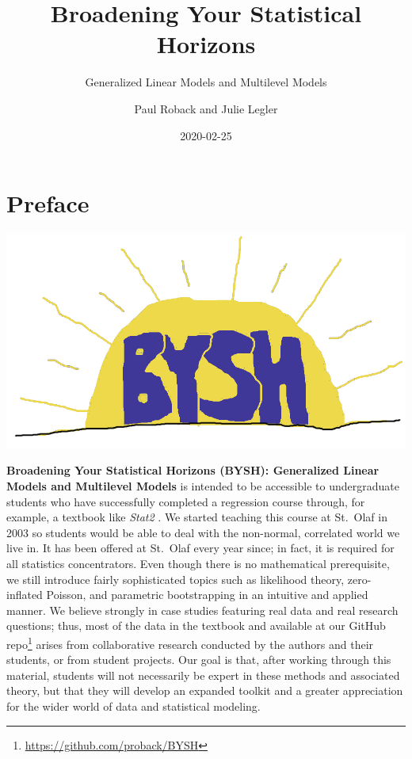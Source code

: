 \documentclass[
]{krantz}
\title{Broadening Your Statistical Horizons}
\subtitle{Generalized Linear Models and Multilevel Models}
\author{Paul Roback and Julie Legler}
\date{2020-02-25}
\renewcommand{\href}[2]{#2\footnote{\url{#1}}}
\begin{document}
\maketitle


\thispagestyle{empty}

\setlength{\abovedisplayskip}{-5pt}
\setlength{\abovedisplayshortskip}{-5pt}

{
\hypersetup{linkcolor=}
\setcounter{tocdepth}{2}
\tableofcontents
}
\mainmatter

\hypertarget{preface}{%
\chapter*{Preface}\label{preface}}


\includegraphics[width=0.75\linewidth]{data/cover}

\textbf{Broadening Your Statistical Horizons (BYSH): Generalized Linear Models and Multilevel Models} is intended to be accessible to undergraduate students who have successfully completed a regression course through, for example, a textbook like \emph{Stat2} \citep{Cannon2019}. We started teaching this course at St.~Olaf in 2003 so students would be able to deal with the non-normal, correlated world we live in. It has been offered at St.~Olaf every year since; in fact, it is required for all statistics concentrators. Even though there is no mathematical prerequisite, we still introduce fairly sophisticated topics such as likelihood theory, zero-inflated Poisson, and parametric bootstrapping in an intuitive and applied manner. We believe strongly in case studies featuring real data and real research questions; thus, most of the data in the textbook and \href{https://github.com/proback/BYSH}{available at our GitHub repo} arises from collaborative research conducted by the authors and their students, or from student projects. Our goal is that, after working through this material, students will not necessarily be expert in these methods and associated theory, but that they will develop an expanded toolkit and a greater appreciation for the wider world of data and statistical modeling.
\end{document}
